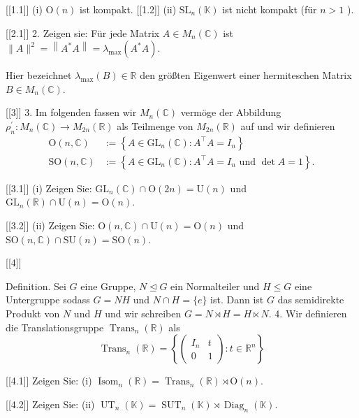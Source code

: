 
[[1.1]]
(i) $\mathrm{O}(n)$ ist kompakt.
[[1.2]]
(ii) $\mathrm{SL}_n(\mathbb{K})$ ist nicht kompakt (für $n>1$ ).

[[2.1]]
2. Zeigen sie: Für jede Matrix $A \in M_n(\mathbb{C})$ ist $\|A\|^2=\left\|A^* A\right\|=\lambda_{\max }\left(A^* A\right)$.

Hier bezeichnet $\lambda_{\max }(B) \in \mathbb{R}$ den größten Eigenwert einer hermiteschen Matrix $B \in M_n(\mathbb{C})$.

[[3]]
3. Im folgenden fassen wir $M_n(\mathbb{C})$ vermöge der Abbildung $\rho_n^{\prime}: M_n(\mathbb{C}) \rightarrow M_{2 n}(\mathbb{R})$ als Teilmenge von $M_{2 n}(\mathbb{R})$ auf und wir definieren
$$
\begin{aligned}
\mathrm{O}(n, \mathbb{C}) & :=\left\{A \in \mathrm{GL}_n(\mathbb{C}): A^{\top} A=I_n\right\} \\
\mathrm{SO}(n, \mathbb{C}) & :=\left\{A \in \mathrm{GL}_n(\mathbb{C}): A^{\top} A=I_n \text { und } \operatorname{det} A=1\right\} .
\end{aligned}
$$




[[3.1]]
(i) Zeigen Sie: $\mathrm{GL}_n(\mathbb{C}) \cap \mathrm{O}(2 n)=\mathrm{U}(n)$ und $\mathrm{GL}_n(\mathbb{R}) \cap \mathrm{U}(n)=\mathrm{O}(n)$.

[[3.2]]
(ii)  Zeigen Sie: $\mathrm{O}(n, \mathbb{C}) \cap \mathrm{U}(n)=\mathrm{O}(n)$ und $\mathrm{SO}(n, \mathbb{C}) \cap \mathrm{SU}(n)=\mathrm{SO}(n)$.

[[4]]

Definition. Sei $G$ eine Gruppe, $N \unlhd G$ ein Normalteiler und $H \leq G$ eine Untergruppe sodass $G=N H$ und $N \cap H=\{e\}$ ist. Dann ist $G$ das semidirekte Produkt von $N$ und $H$ und wir schreiben $G=N \rtimes H=H \ltimes N$.
4. Wir definieren die Translationsgruppe $\operatorname{Trans}_n(\mathbb{R})$ als
$$
\operatorname{Trans}_n(\mathbb{R})=\left\{\left(\begin{array}{cc}
I_n & t \\
0 & 1
\end{array}\right): t \in \mathbb{R}^n\right\}
$$

[[4.1]]
Zeigen Sie:
(i) $\operatorname{Isom}_n(\mathbb{R})=\operatorname{Trans}_n(\mathbb{R}) \rtimes \mathrm{O}(n)$.

[[4.2]] Zeigen Sie:
(ii) $\operatorname{UT}_n(\mathbb{K})=\operatorname{SUT}_n(\mathbb{K}) \rtimes \operatorname{Diag}_n(\mathbb{K})$.